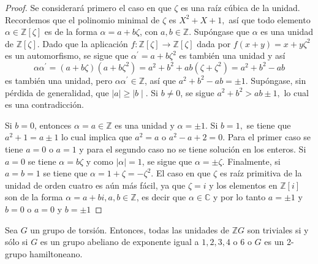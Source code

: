 \begin{proof}
Se considerará primero el caso en que $\zeta$ es una raíz cúbica de la unidad. Recordemos que el polinomio minimal de $\zeta$ es $X^2 + X + 1,$ así que todo elemento $\alpha \in \mathds{Z}[\zeta]$ es de la forma $\alpha = a+b\zeta$, con $a,b \in \mathds{Z}$. Supóngase que $\alpha$ es una unidad de $\mathds{Z}[\zeta]$. Dado que la aplicación $f \colon \mathds{Z}[\zeta]\to \mathds{Z}[\zeta]$ dada por $f(x+y) = x+y\zeta^2$ es un automorfismo, se sigue que $\alpha^{'} = a + b\zeta^2$ es también una unidad y así \[ \alpha\alpha^{'} = (a + b\zeta)(a + b\zeta^2) = a^2 + b^2 + ab(\zeta  + \zeta^2) = a^2 + b^2 -ab \] es también una unidad, pero $\alpha\alpha^{'} \in \mathds{Z}$, así que $a^2 + b^2 -ab = \pm 1$. Supóngase, sin pérdida de generalidad, que $\mid a \mid \geq \mid b \mid$. Si $b \neq 0$, se sigue $a^2 + b^2 > ab \pm 1,$ lo cual es una contradicción. 

Si $b = 0$, entonces $\alpha = a \in \mathds{Z}$ es una unidad y $\alpha = \pm 1$. Si $b = 1,$ se tiene que $a^2 + 1 = a \pm 1$ lo cual implica que $a^2 = a$ o  $a^2-a+2 = 0$. Para el primer caso se tiene $a = 0$  o $a=1$ y para el segundo caso no se tiene solución en los enteros. Si $a=0$ se tiene $\alpha = b\zeta$ y como $\mid \alpha \mid = 1$, se sigue que $\alpha = \pm \zeta$. Finalmente, si $a = b = 1$ se tiene que $\alpha =1 + \zeta = -\zeta^2$.
El caso en que $\zeta$ es raíz primitiva de la unidad de orden cuatro es aún más fácil, ya que $\zeta = i$ y los elementos en $\mathds{Z}[i]$ son de la forma $\alpha = a + bi, a,b \in \mathds{Z}$, es decir que $\alpha \in \mathds{C}$ y por lo tanto $a = \pm 1$ y $b = 0$ o $a = 0$ y $b = \pm 1$
\end{proof}
\begin{teorema}[Higman]\label{teo:Higman}
Sea $G$ un grupo de torsión. Entonces, todas las unidades de $\mathds{Z}G$ son triviales si y sólo si $G$ es un grupo abeliano de exponente igual a $1,2,3,4$ o $6$ o $G$ es un 2-grupo hamiltoneano. 
\end{teorema}
